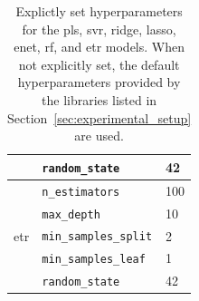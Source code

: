 \begin{table}
\begin{tabular}{@{}llp{}@{}}
& \texttt{random\_state} & 42 \\
\midrule
\multirow{5}{*}{\gls{etr}}
& \texttt{n\_estimators} & 100 \\
& \texttt{max\_depth} & 10 \\
& \texttt{min\_samples\_split} & 2 \\
& \texttt{min\_samples\_leaf} & 1 \\
& \texttt{random\_state} & 42 \\
\midrule
\end{tabular}
\caption{Explictly set hyperparameters for the \gls{pls}, \gls{svr}, ridge, \gls{lasso}, \gls{enet}, \gls{rf}, and \gls{etr} models. When not explicitly set, the default hyperparameters provided by the libraries listed in Section~\ref{sec:experimental_setup} are used.}
\label{tab:combined_hyperparameters}
\end{table}


